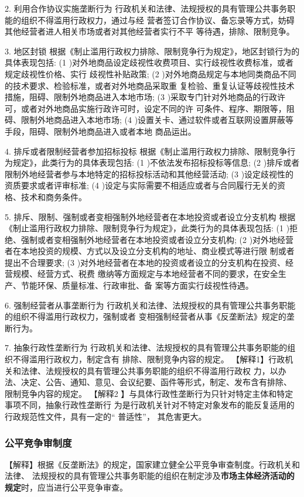 \documentclass[UTF8,12pt]{ctexart}
\numberwithin{equation}{section} %
\numberwithin{figure}{section}
\numberwithin{table}{section}
\begin{document}
	2. 利用合作协议实施垄断行为 行政机关和法律、法规授权的具有管理公共事务职能的组织不得滥用行政权力，通过与经 营者签订合作协议、备忘录等方式，妨碍其他经营者进人相关市场或者对其他经营者实行不平 等待遇，排除、限制竞争。
	
	3. 地区封锁 根据《制止滥用行政权力排除、限制竞争行为规定》，地区封锁行为的具体表现包括:
	(1 )对外地商品设定歧视性收费项目、实行歧视性收费标准，或者规定歧视性价格、实行 歧视性补贴政策;
	(2 )对外地商品规定与本地同类商品不同的技术要求、检验标准，或者对外地商品采取重 复检验、重复认证等歧视性技术措施，阻碍、限制外地商品进入本地市场;
	(3 )采取专门针对外地商品的行政许可，或者对外地商品实施行政许可时，设定不同的许 可条件、程序、期限等，阻碍、限制外地商品进入本地市场;
	(4 )设置关卡、通过软件或者互联网设置屏蔽等手段，阻碍、限制外地商品进入或者本地 商品运出。
	
	4. 排斥或者限制经营者参加招标投标 根据《制止滥用行政权力排除、限制竞争行为规定》，此类行为的具体表现包括:
	(1 )不依法发布招标投标等信息;
	(2 )排斥或者限制外地经营者参与本地特定的招标投标活动和其他经营活动;
	(3 )设定歧视性的资质要求或者评审标准;
	(4 )设定与实际需要不相适应或者与合同履行无关的资格、技术和商务条件。
	
	5. 排斥、限制、强制或者变相强制外地经营者在本地投资或者设立分支机构 根据《制止滥用行政权力排除、限制竞争行为规定》，此类行为的具体表现包括:
	(1 )拒绝、强制或者变相强制外地经营者在本地投资或者设立分支机构;
	(2 )对外地经营者在本地投资的规模、方式以及设立分支机构的地址、商业模式等进行限
	制或者提出不合理要求;
	(3 )对外地经营者在本地的投资或者设立的分支机构在投资、经营规模、经营方式、税费 缴纳等方面规定与本地经营者不同的要求，在安全生产、节能环保、质量标准、行政审批、备 案等方面实行歧视性待遇。
	
	6. 强制经营者从事垄断行为 行政机关和法律、法规授权的具有管理公共事务职能的组织不得滥用行政权力，强制或者 变相强制经营者从事《反垄断法》规定的垄断行为。
	
	7. 抽象行政性垄断行为 行政机关和法律、法规授权的具有管理公共事务职能的组织不得滥用行政权力，制定含有 排除、限制竞争内容的规定。
	【解释1】行政机关和法律、法规授权的具有管理公共事务职能的组织不得滥用行政权 力，以办法、决定、公告、通知、意见、会议纪要、函件等形式，制定、发布含有排除、 限制竞争内容的规定。
	【解释2 】与具体行政性垄断行为只针对特定主体和特定事项不同，抽象行政性垄断行 为是行政机关针对不特定对象发布的能反复适用的行政规范性文件，具有一定的“ 普适性”， 其危害更大。
	
	\subsubsection{公平竞争审制度}
	【解释】根据《反垄断法》的规定，国家建立健全公平竞争审查制度。行政机关和法律、 法规授权的具有管理公共事务职能的组织在制定涉及\textbf{市场主体经济活动的规定}时，应当进行公平竞争审查。
	
\end{document}
